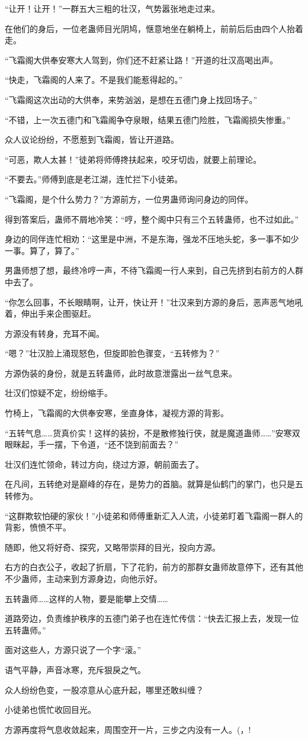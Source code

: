 \begin{this_body}
“让开！让开！”一群五大三粗的壮汉，气势嚣张地走过来。

在他们的身后，一位老蛊师目光阴鸠，惬意地坐在躺椅上，前前后后由四个人抬着走。

“飞霜阁大供奉安寒大人驾到，你们还不赶紧让路！”开道的壮汉高喝出声。

“快走，飞霜阁的人来了。不是我们能惹得起的。”

“飞霜阁这次出动的大供奉，来势汹汹，是想在五德门身上找回场子。”

“不错，上一次五德门和飞霜阁争夺泉眼，结果五德门险胜，飞霜阁损失惨重。”

众人议论纷纷，不愿惹到飞霜阁，皆让开道路。

“可恶，欺人太甚！”徒弟将师傅搀扶起来，咬牙切齿，就要上前理论。

“不要去。”师傅到底是老江湖，连忙拦下小徒弟。

“飞霜阁，是个什么势力？”方源前方，一位男蛊师询问身边的同伴。

得到答案后，蛊师不屑地冷笑：“哼，整个阁中只有三个五转蛊师，也不过如此。”

身边的同伴连忙相劝：“这里是中洲，不是东海，强龙不压地头蛇，多一事不如少一事。算了，算了。”

男蛊师想了想，最终冷哼一声，不待飞霜阁一行人来到，自己先挤到右前方的人群中去了。

“你怎么回事，不长眼睛啊，让开，快让开！”壮汉来到方源的身后，恶声恶气地吼着，伸出手来企图驱赶。

方源没有转身，充耳不闻。

“嗯？”壮汉脸上涌现怒色，但旋即脸色骤变，“五转修为？”

方源伪装的身份，就是五转蛊师，此时故意泄露出一丝气息来。

壮汉们惊疑不定，纷纷缩手。

竹椅上，飞霜阁的大供奉安寒，坐直身体，凝视方源的背影。

“五转气息……货真价实！这样的装扮，不是散修独行侠，就是魔道蛊师……”安寒双眼眯起，手一摆，下令道，“还不饶到前面去？”

壮汉们连忙领命，转过方向，绕过方源，朝前面去了。

在凡间，五转绝对是巅峰的存在，是势力的首脑。就算是仙鹤门的掌门，也只是五转修为。

“这群欺软怕硬的家伙！”小徒弟和师傅重新汇入人流，小徒弟盯着飞霜阁一群人的背影，愤愤不平。

随即，他又将好奇、探究，又略带崇拜的目光，投向方源。

右方的白衣公子，收起了折扇，下了花豹，前方的那群女蛊师故意停下，还有其他不少蛊师，主动来到方源身边，向他示好。

五转蛊师……这样的人物，要是能攀上交情……

道路旁边，负责维护秩序的五德门弟子也在连忙传信：“快去汇报上去，发现一位五转蛊师。”

面对这些人，方源只说了一个字“滚。”

语气平静，声音冰寒，充斥狠戾之气。

众人纷纷色变，一股凉意从心底升起，哪里还敢纠缠？

小徒弟也慌忙收回目光。

方源再度将气息收敛起来，周围空开一片，三步之内没有一人。(，!

\end{this_body}

